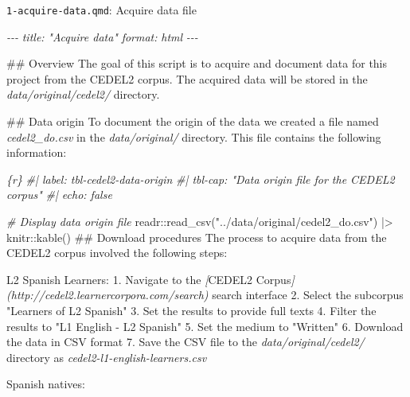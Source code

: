 \documentclass[
  letterpaper,
  DIV=11,
  numbers=noendperiod]{scrreport}
\newenvironment{Shaded}{\begin{snugshade}}{\end{snugshade}}
\newcommand{\AnnotationTok}[1]{\textcolor[rgb]{0.00,0.00,0.00}{\textit{#1}}}
\newcommand{\CommentTok}[1]{\textcolor[rgb]{0.00,0.00,0.00}{\textit{#1}}}
\newcommand{\FunctionTok}[1]{\textcolor[rgb]{0.00,0.00,0.00}{#1}}
\newcommand{\InformationTok}[1]{\textcolor[rgb]{0.00,0.00,0.00}{\textit{#1}}}
\newcommand{\NormalTok}[1]{\textcolor[rgb]{0.00,0.00,0.00}{#1}}
\newcommand{\OtherTok}[1]{\textcolor[rgb]{0.00,0.00,0.00}{#1}}
\newcommand{\SpecialCharTok}[1]{\textcolor[rgb]{0.00,0.00,0.00}{#1}}
\newcommand{\SpecialStringTok}[1]{\textcolor[rgb]{0.00,0.00,0.00}{#1}}
\newcommand{\StringTok}[1]{\textcolor[rgb]{0.00,0.00,0.00}{#1}}
\theoremstyle{definition}
\theoremstyle{remark}
\begin{document}
\begin{codelisting}

\caption{\texttt{1-acquire-data.qmd}: Acquire data file}

\hypertarget{lst-ad-cedel2-acquire-data-qmd}{%
\label{lst-ad-cedel2-acquire-data-qmd}}%
\begin{Shaded}
\begin{Highlighting}[]
\CommentTok{{-}{-}{-}}
\AnnotationTok{title:}\CommentTok{ "Acquire data"}
\AnnotationTok{format:}\CommentTok{ html}
\CommentTok{{-}{-}{-}}

\FunctionTok{\#\# Overview}
\NormalTok{The goal of this script is to acquire and document data for this project from the CEDEL2 corpus. The acquired data will be stored in the }\InformationTok{\textasciigrave{}data/original/cedel2/\textasciigrave{}}\NormalTok{ directory.}

\FunctionTok{\#\# Data origin}
\NormalTok{To document the origin of the data we created a file named }\InformationTok{\textasciigrave{}cedel2\_do.csv\textasciigrave{}}\NormalTok{ in the }\InformationTok{\textasciigrave{}data/original/\textasciigrave{}}\NormalTok{ directory. This file contains the following information: }

\InformationTok{\textasciigrave{}\textasciigrave{}\textasciigrave{}\{r\}}
\CommentTok{\#| label: tbl{-}cedel2{-}data{-}origin}
\CommentTok{\#| tbl{-}cap: "Data origin file for the CEDEL2 corpus"}
\CommentTok{\#| echo: false}

\CommentTok{\# Display data origin file}
\NormalTok{readr}\SpecialCharTok{::}\FunctionTok{read\_csv}\NormalTok{(}\StringTok{"../data/original/cedel2\_do.csv"}\NormalTok{) }\SpecialCharTok{|\textgreater{}}\NormalTok{ knitr}\SpecialCharTok{::}\FunctionTok{kable}\NormalTok{()}
\InformationTok{\textasciigrave{}\textasciigrave{}\textasciigrave{}}
\FunctionTok{\#\# Download procedures  }
\NormalTok{The process to acquire data from the CEDEL2 corpus involved the following steps:}

\NormalTok{L2 Spanish Learners:  }
\SpecialStringTok{1. }\NormalTok{Navigate to the }\CommentTok{[}\OtherTok{CEDEL2 Corpus}\CommentTok{](http://cedel2.learnercorpora.com/search)}\NormalTok{ search interface}
\SpecialStringTok{2. }\NormalTok{Select the subcorpus "Learners of L2 Spanish"}
\SpecialStringTok{3. }\NormalTok{Set the results to provide full texts}
\SpecialStringTok{4. }\NormalTok{Filter the results to "L1 English {-} L2 Spanish"}
\SpecialStringTok{5. }\NormalTok{Set the medium to "Written"}
\SpecialStringTok{6. }\NormalTok{Download the data in CSV format}
\SpecialStringTok{7. }\NormalTok{Save the CSV file to the }\InformationTok{\textasciigrave{}data/original/cedel2/\textasciigrave{}}\NormalTok{ directory as }\InformationTok{\textasciigrave{}cedel2{-}l1{-}english{-}learners.csv\textasciigrave{}}

\NormalTok{Spanish natives: }
\end{Highlighting}
\end{Shaded}

\end{codelisting}
\end{document}
